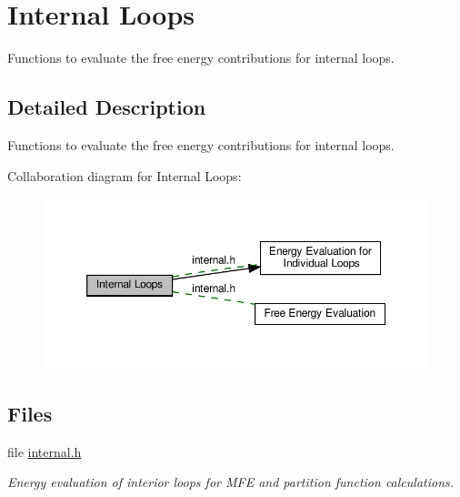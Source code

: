 \hypertarget{group__eval__loops__int}{}\section{Internal Loops}
\label{group__eval__loops__int}


Functions to evaluate the free energy contributions for internal loops.  




\subsection{Detailed Description}
Functions to evaluate the free energy contributions for internal loops. 

Collaboration diagram for Internal Loops\+:
\nopagebreak
\begin{figure}[H]
\begin{center}
\leavevmode
\includegraphics[width=350pt]{group__eval__loops__int}
\end{center}
\end{figure}
\subsection*{Files}
\begin{DoxyCompactItemize}
\item 
file \hyperlink{internal_8h}{internal.\+h}
\begin{DoxyCompactList}\small\item\em Energy evaluation of interior loops for M\+FE and partition function calculations. \end{DoxyCompactList}\end{DoxyCompactItemize}
